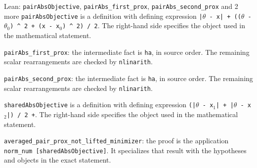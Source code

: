 \documentclass[11pt,a4paper]{article}
\begin{document}
\begin{leanbox}{Lean: \texttt{pairAbsObjective}, \texttt{pairAbs\_\allowbreak{}first\_\allowbreak{}prox}, \texttt{pairAbs\_\allowbreak{}second\_\allowbreak{}prox} and 2 more}
\texttt{pair\allowbreak{}Abs\allowbreak{}Objective} is a definition with defining expression \texttt{|\ensuremath{\theta} -\allowbreak{} x| + ((\ensuremath{\theta} -\allowbreak{} \ensuremath{\theta}\ensuremath{{}_{0}}) \textasciicircum{} 2 + (x -\allowbreak{} x\ensuremath{{}_{0}}) \textasciicircum{} 2) /\allowbreak{} 2}. The right-hand side specifies the object used in the mathematical statement.



\texttt{pair\allowbreak{}Abs\_\allowbreak{}first\_\allowbreak{}prox}: the intermediate fact is \texttt{ha}, in source order. The remaining scalar rearrangements are checked by \texttt{nlinarith}.



\texttt{pair\allowbreak{}Abs\_\allowbreak{}second\_\allowbreak{}prox}: the intermediate fact is \texttt{ha}, in source order. The remaining scalar rearrangements are checked by \texttt{nlinarith}.



\texttt{shared\allowbreak{}Abs\allowbreak{}Objective} is a definition with defining expression \texttt{(|\ensuremath{\theta} -\allowbreak{} x\ensuremath{{}_{1}}| + |\ensuremath{\theta} -\allowbreak{} x\ensuremath{{}_{2}}|) /\allowbreak{} 2 +}. The right-hand side specifies the object used in the mathematical statement.



\texttt{averaged\_\allowbreak{}pair\_\allowbreak{}prox\_\allowbreak{}not\_\allowbreak{}lifted\_\allowbreak{}minimizer}: the proof is the application \texttt{norm\_\allowbreak{}num [shared\allowbreak{}Abs\allowbreak{}Objective]}. It specializes that result with the hypotheses and objects in the exact statement.
\end{leanbox}
\end{document}

